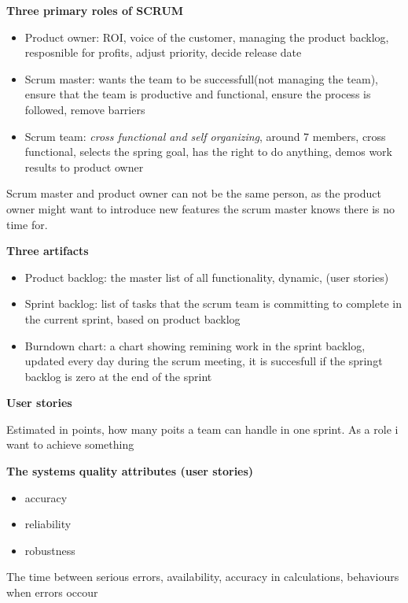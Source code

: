 \documentclass{article}
\begin{document}
\begin{flushleft}
    \textbf{Three primary roles of SCRUM}\par
    \begin{itemize}
        \item Product owner: ROI, voice of the customer, managing the product backlog, resposnible for profits, adjust priority, decide release date
        \item Scrum master: wants the team to be successfull(not managing the team), ensure that the team is productive and functional, ensure the process is followed, remove barriers
        \item Scrum team: \emph{cross functional and self organizing}, around 7 members, cross functional, selects the spring goal, has the right to do anything, demos work results to product owner
    \end{itemize}
    Scrum master and product owner can not be the same person, as the product owner might want to introduce new features the scrum master knows there is no time for. 
    \bigskip

    \textbf{Three artifacts}\par
    \begin{itemize}
        \item Product backlog: the master list of all functionality, dynamic, (user stories)
        \item Sprint backlog: list of tasks that the scrum team is committing to complete in the current sprint, based on product backlog
        \item Burndown chart: a chart showing remining work in the sprint backlog, updated every day during the scrum meeting, it is succesfull if the springt backlog is zero at the end of the sprint
    \end{itemize}

    \textbf{User stories}\par 
    Estimated in points, how many poits a team can handle in one sprint. 
    As a role i want to achieve something \par
    \bigskip


   

    \textbf{The systems quality attributes (user stories)}\par 
    \begin{itemize}
        \item accuracy
        \item reliability
        \item robustness
    \end{itemize}
    The time between serious errors, availability, accuracy in calculations, behaviours when errors occour


\end{flushleft}
\end{document}
